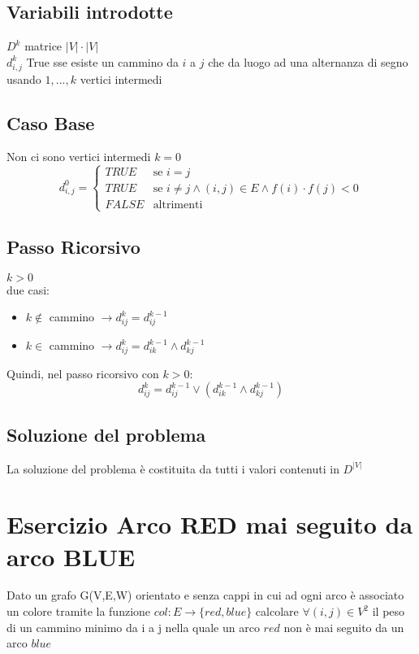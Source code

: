 \documentclass[12pt, a4paper, openany]{book}
\begin{document}
\subsection*{Variabili introdotte}
$D^k$ matrice $|V|\cdot|V|$
\\$d^k_{i,j}$ True sse esiste un cammino da $i$ a $j$ che da luogo ad una alternanza di segno usando ${1,...,k}$ vertici intermedi

	\subsection*{Caso Base} Non ci sono vertici intermedi $k=0$
	\begin{equation*}
		d^0_{i,j} = \begin{cases}
			TRUE  & \text{se $i=j$}                                                  \\
			TRUE  & \text{se $i\neq j \land (i,j) \in E \land f(i) \cdot f(j) < 0 $} \\
			FALSE & \text{altrimenti}
		\end{cases}
	\end{equation*}

	\subsection*{Passo Ricorsivo} $k>0$\\
	due casi:
	\begin{itemize}
		\item $k\notin$ cammino $\rightarrow d^k_{ij} = d^{k-1}_{ij}$
		\item $k \in$ cammino $\rightarrow d^k_{ij} = d^{k-1}_{ik} \land d^{k-1}_{kj}$
	\end{itemize}
	Quindi, nel passo ricorsivo con $k>0$:
	\begin{equation*}
		d^k_{ij} = d^{k-1}_{ij} \lor  (d^{k-1}_{ik} \land d^{k-1}_{kj})
	\end{equation*}

	\subsection*{Soluzione del problema}
	La soluzione del problema è costituita da tutti i valori contenuti in $D^{|V|}$

	\section{Esercizio Arco RED mai seguito da arco BLUE}
	Dato un grafo G(V,E,W) orientato e senza cappi in cui ad ogni arco è associato un colore tramite la funzione $col: E\rightarrow \{red,blue\}$
	calcolare $\forall (i,j) \in V^2$ il peso di un cammino minimo da i a j nella quale un arco $red$ non è mai seguito da un arco $blue$
\end{document}
